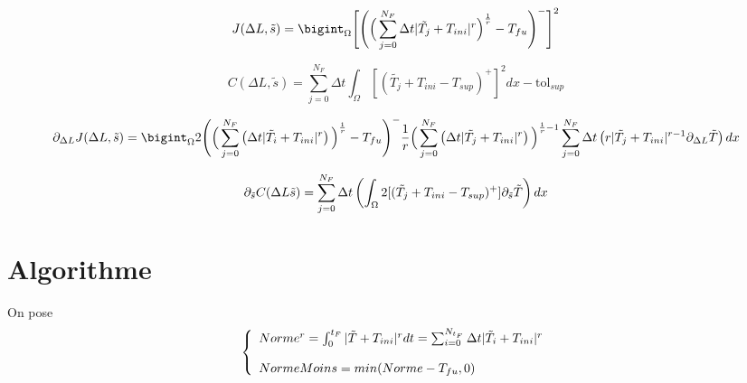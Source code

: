 \documentclass[11pt,a4paper]{article}
\begin{document}
\begin{equation}
J(\Delta L,\tilde{s})=\bigint_{\Omega}\Bigg[\Bigg(\Big(\sum_{j=0}^{N_F}\Delta t|\tilde{T_j}+T_{ini}|^r\Big)^{\frac{1}{r}}-T_{fu}\Bigg)^-\Bigg]^2 
\end{equation}


\begin{equation}
C(\Delta L,\tilde{s})=\sum_{j=0}^{N_F}\Delta t\int_{\Omega}[(\tilde{T_j}+T_{ini}-T_{sup})^+]^2dx-\textrm{tol}_{sup}
\end{equation}

\begin{equation}
\partial_{\Delta L}J(\Delta L,\stilde)= \bigint_{\Omega}2\Bigg(\Big(\sum_{j=0}^{N_F}\left(\Delta t|\tilde{T_i}+T_{ini}|^r\right)\Big)^{\frac{1}{r}}-T_{fu}\Bigg)^-\frac{1}{r}\Big(\sum_{j=0}^{N_F}\left(\Delta t|\tilde{T_j}+T_{ini}|^r\right)\Big)^{\frac{1}{r}-1}\sum_{j=0}^{N_F}\Delta t\left(r|\tilde{T_j}+T_{ini}|^{r-1}\partial_{\Delta L} \tilde{T}\right)dx 
\end{equation}

\begin{equation}
\partial_{\tilde{s}}C(\Delta L\tilde{s})= \sum_{j=0}^{N_F}\Delta t\left(\int_{\Omega}2[(\tilde{T_j}+T_{ini}-T_{sup})^+]\partial_{\tilde{s}} \tilde{T}\right)dx
\end{equation}


\section*{Algorithme}
On pose 
\begin{equation}
\left\{\begin{array}{l}
	Norme^r=\int_{0}^{t_F}|\tilde{T}+T_{ini}|^rdt=\sum_{i=0}^{N_{t_F}}\Delta t |\tilde{T}_i+T_{ini}|^r \\
	\\
	NormeMoins=min(Norme-T_{fu},0) \\	
	\end{array}\right.
\end{equation}
\end{document}
